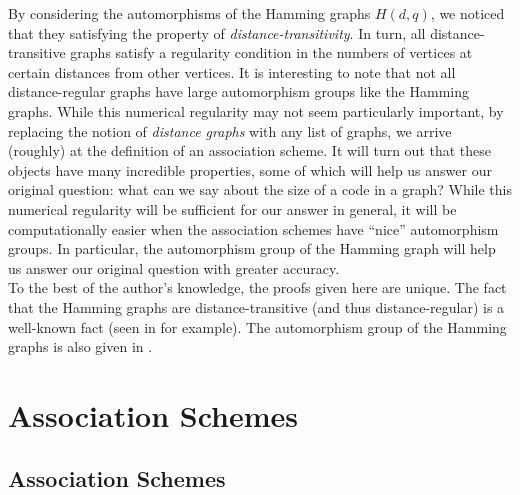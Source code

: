 \documentclass{report}
\begin{document}
    By considering the automorphisms of the Hamming graphs $H(d, q)$, we noticed
    that they satisfying the property of \textit{distance-transitivity}.  In
    turn, all distance-transitive graphs satisfy a regularity condition in the
    numbers of vertices at certain distances from other vertices.  It is
    interesting to note that not all distance-regular graphs have large
    automorphism groups like the Hamming graphs.  While this numerical
    regularity may not seem particularly important, by replacing the notion of
    \textit{distance graphs} with any list of graphs, we arrive (roughly) at the
    definition of an association scheme.  It will turn out that these objects
    have many incredible properties, some of which will help us answer our
    original question: what can we say about the size of a code in a graph?
    While this numerical regularity will be sufficient for our answer in
    general, it will be computationally easier when the association schemes have
    ``nice'' automorphism groups.  In particular, the automorphism group of the
    Hamming graph will help us answer our original question with greater
    accuracy.
    \\

    To the best of the author's knowledge, the proofs given here are unique.
    The fact that the Hamming graphs are distance-transitive (and thus
    distance-regular) is a well-known fact (seen in \cite[Section~11.1]{godsil}
    for example).  The automorphism group of the Hamming graphs is also given 
    in \cite{mirafzal}.

\chapter{Association Schemes}\label{ch:AS}
  \section{Association Schemes}\label{sec:AS:AS}
\end{document}
